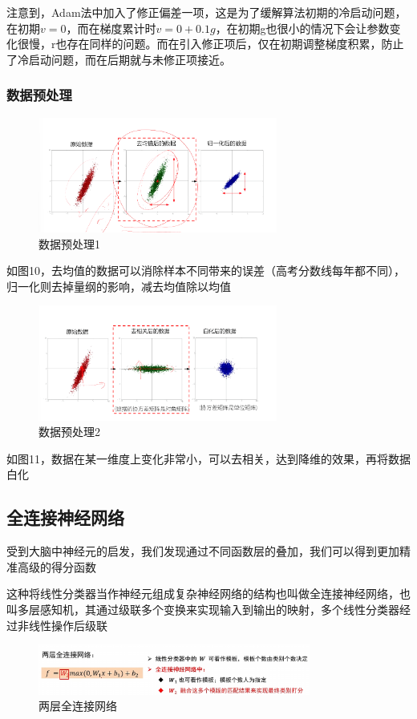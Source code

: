 \documentclass[12pt]{article}
\begin{document}
注意到，Adam法中加入了修正偏差一项，这是为了缓解算法初期的冷启动问题，在初期$v=0$，而在梯度累计时$v=0+0.1g$，在初期g也很小的情况下会让参数变化很慢，r也存在同样的问题。而在引入修正项后，仅在初期调整梯度积累，防止了冷启动问题，而在后期就与未修正项接近。

\subsubsection{数据预处理}
\begin{figure}[ht]  %
\centering
\includegraphics[width=0.7\textwidth]{pic17.png}
\caption{数据预处理1}
\end{figure}
如图10，去均值的数据可以消除样本不同带来的误差（高考分数线每年都不同），归一化则去掉量纲的影响，减去均值除以均值
\begin{figure}[ht]  %
\centering
\includegraphics[width=0.7\textwidth]{pic18.png}
\caption{数据预处理2}
\end{figure}
如图11，数据在某一维度上变化非常小，可以去相关，达到降维的效果，再将数据白化

\subsection{全连接神经网络}
受到大脑中神经元的启发，我们发现通过不同函数层的叠加，我们可以得到更加精准高级的得分函数

这种将线性分类器当作神经元组成复杂神经网络的结构也叫做全连接神经网络，也叫多层感知机，其通过级联多个变换来实现输入到输出的映射，多个线性分类器经过非线性操作后级联
\begin{figure}[ht]  %
\centering
\includegraphics[width=0.8\textwidth]{pic19.png}
\caption{两层全连接网络}
\end{figure}
\end{document}
